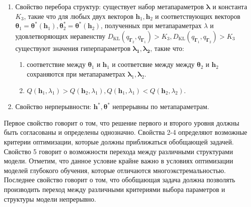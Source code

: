 \begin{defin}
\begin{enumerate}
\item Свойство перебора структур: существует набор метапараметров $\boldsymbol{\lambda}$ и константа $K_3$, такие что для любых двух векторов $\mathbf{h}_{1}, \mathbf{h}_2$ и соответствующих векторов $\boldsymbol{\theta}_1 = \boldsymbol{\theta}^{*}(\mathbf{h}_1),\boldsymbol{\theta}_2^{*}= \boldsymbol{\theta}^{*}(\mathbf{h}_2)$, полученных при метапараметрах $\lambda$ и удовлетворяющих неравенству $D_\text{KL}(q_{\boldsymbol{\Gamma}_2}, q_{\boldsymbol{\Gamma}_1})>K_3, D_\text{KL}(q_{\boldsymbol{\Gamma}_1}, q_{\boldsymbol{\Gamma}_2})>K_3$  существуют значения гиперпараметров $\boldsymbol{\lambda_1},\boldsymbol{\lambda_2}$, такие что:
\begin{enumerate}
\item соответствие между $\boldsymbol{\theta}_1$ и $\mathbf{h}_1$ и соответсвие между  между $\boldsymbol{\theta}_2$ и $\mathbf{h}_2$ сохраняются при метапараметрах $\boldsymbol{\lambda}_1, \boldsymbol{\lambda}_2$.
\item $Q(\mathbf{h}_1, \lambda_1) > Q(\mathbf{h}_2, \lambda_1), Q(\mathbf{h}_1, \lambda_1) < Q(\mathbf{h}_2, \lambda_2)$.
\end{enumerate}  

\item Свойство нерперывности: $\mathbf{h}^{*}, \boldsymbol{\theta}^{*}$ непрерывны по метапараметрам.
\end{enumerate}
\end{defin}
Первое свойство говорит о том, что решение первого и второго уровня должны быть согласованы и определены однозначно.
Свойства 2-4 определяют возможные критерии оптимизации, которые должны приближаться обобщающей задачей.
Свойство 5 говорит о возможности перехода между различными структурами модели. Отметим, что данное условие крайне важно в условиях оптимизации моделей глубокого обучения, которые отличаются многоэкстремальностью.
Последнее свойство говорит о том, что обобщающая задача должна позволять производить переход между различными критериями выбора  параметров и структуры модели непрерывно.

